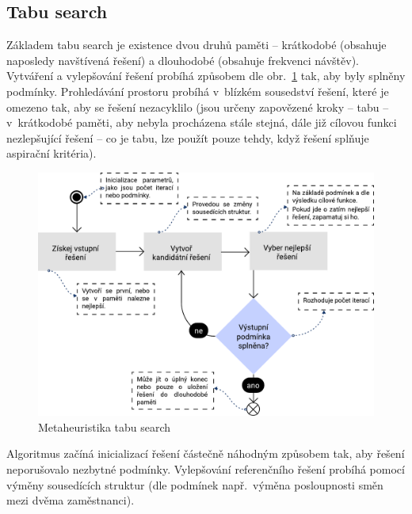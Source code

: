 \documentclass[twoside]{ctuthesis}
\begin{document}
\subsection{Tabu search}
Základem tabu search je existence dvou druhů paměti – krátkodobé (obsahuje naposledy navštívená řešení) a dlouhodobé (obsahuje frekvenci návštěv). \cite{liang2020optimization} Vytváření a vylepšování řešení probíhá způsobem dle obr.~\ref{fig:tabusearch} tak, aby byly splněny podmínky. Prohledávání prostoru probíhá v~blízkém sousedství řešení, které je omezeno tak, aby se řešení nezacyklilo (jsou určeny zapovězené kroky -- tabu -- v~krátkodobé paměti, aby nebyla procházena stále stejná, dále již cílovou funkci nezlepšující řešení -- co je tabu, lze použít pouze tehdy, když řešení splňuje aspirační kritéria).  \cite{glover1990tabu}

\begin{figure}[h]
	\includegraphics[scale=0.7]{img/tabu-search.pdf}
	\caption{Metaheuristika tabu search}
	\label{fig:tabusearch}
\end{figure}

 Algoritmus začíná inicializací řešení částečně náhodným způsobem tak, aby řešení neporušovalo nezbytné podmínky. Vylepšování referenčního řešení probíhá pomocí výměny sousedících struktur (dle podmínek např.~výměna posloupnosti směn mezi dvěma zaměstnanci). \cite{ramli2020tabu}

\end{document}
